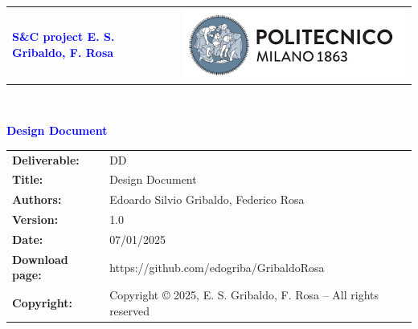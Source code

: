 




\begin{titlepage}



{\begin{table}[t!]
\centering
\begin{tabu} to \textwidth { X[1.3,r,p] X[1.7,l,p] }
\textcolor{Blue}
{\textbf{\small{S\&C project E. S. Gribaldo, F. Rosa}}} & \includegraphics[scale=0.5]{Images/PolimiLogo}
\end{tabu}
\end{table}}~\\ [7cm]


\begin{flushleft}

{\textcolor{Blue}{\textbf{\Huge{ Design
        Document}}}} \\ [1cm]

\end{flushleft}

\end{titlepage}

\begin{table}[h!]
\begin{tabu} to \textwidth { X[0.3,r,p] X[0.7,l,p] }
\hline

\textbf{Deliverable:} & DD\\
\textbf{Title:} & Design Document \\
\textbf{Authors:} & Edoardo Silvio Gribaldo, Federico Rosa \\
\textbf{Version:} & 1.0 \\ 
\textbf{Date:} & 07/01/2025 \\
\textbf{Download page:} & https://github.com/edogriba/GribaldoRosa \\
\textbf{Copyright:} & Copyright © 2025, E. S. Gribaldo, F. Rosa – All rights reserved \\
\hline
\end{tabu}
\end{table}





